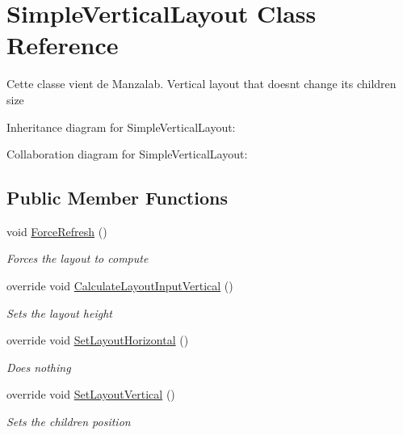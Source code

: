 \hypertarget{class_simple_vertical_layout}{}\section{Simple\+Vertical\+Layout Class Reference}
\label{class_simple_vertical_layout}


Cette classe vient de Manzalab. Vertical layout that doesn\textquotesingle{}t change its children size  




Inheritance diagram for Simple\+Vertical\+Layout\+:


Collaboration diagram for Simple\+Vertical\+Layout\+:
\subsection*{Public Member Functions}
\begin{DoxyCompactItemize}
\item 
void \hyperlink{class_simple_vertical_layout_a7c7f78ba7afa7d7f616bd5dbad9add09}{Force\+Refresh} ()
\begin{DoxyCompactList}\small\item\em Forces the layout to compute \end{DoxyCompactList}\item 
override void \hyperlink{class_simple_vertical_layout_ab051655845a7b1cde35991eadebeb66b}{Calculate\+Layout\+Input\+Vertical} ()
\begin{DoxyCompactList}\small\item\em Sets the layout height \end{DoxyCompactList}\item 
override void \hyperlink{class_simple_vertical_layout_a076d9de03a2bedd0369f7fbf97d0dcde}{Set\+Layout\+Horizontal} ()
\begin{DoxyCompactList}\small\item\em Does nothing \end{DoxyCompactList}\item 
override void \hyperlink{class_simple_vertical_layout_a72ce969a47a265c22f5b8fd6772176cc}{Set\+Layout\+Vertical} ()
\begin{DoxyCompactList}\small\item\em Sets the children position \end{DoxyCompactList}\end{DoxyCompactItemize}
